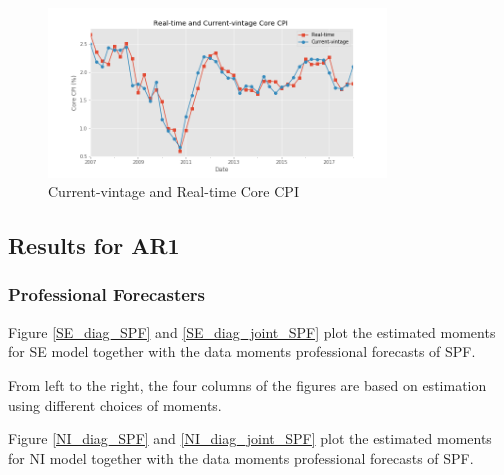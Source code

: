 \documentclass[]{article}
\begin{document}
\begin{figure}[htbp]
	\centering
	\includegraphics[width=0.8\textwidth]{figures/ts_rev_realtime.png}
	\caption{Current-vintage and Real-time Core CPI}
	\label{ts_real_time_current_vintage}
\end{figure}

\subsection{Results for AR1}

\subsubsection{Professional Forecasters}

Figure \ref{SE_diag_SPF} and \ref{SE_diag_joint_SPF} plot the estimated moments for SE model together with the data moments professional forecasts of SPF. 

From left to the right, the four columns of the figures are based on estimation using different choices of moments. 

Figure \ref{NI_diag_SPF} and \ref{NI_diag_joint_SPF} plot the estimated moments for NI model together with the data moments professional forecasts of SPF. 
\end{document}
